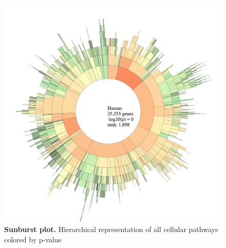 \documentclass[11pt]{article}
\begin{document}
\begin{figure}[htp]
\begin{center}
\includegraphics[width=0.96\linewidth,clip]{./img/full_sunburst.png}
\caption{\label{fig:full_sunburst} {\bf Sunburst plot.} Hierarchical representation of all cellular pathways colored by p-value}
\end{center}
\end{figure}
\end{document}
